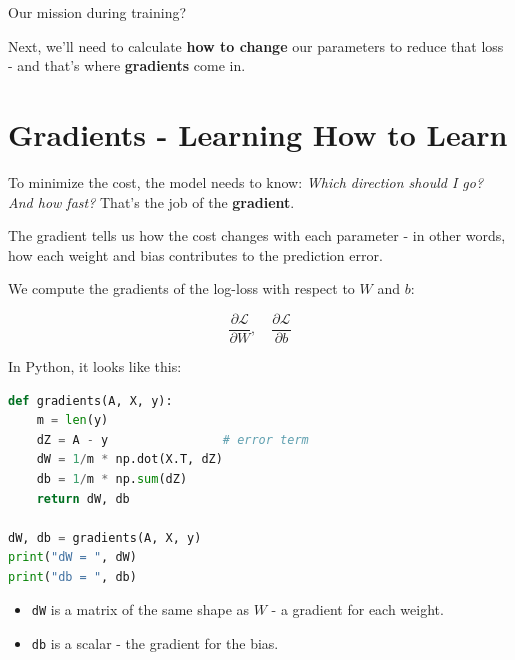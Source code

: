 \documentclass[11pt]{article}
\begin{document}
\vspace{0.5em}

\noindent Our mission during training?  
\begin{center}
\end{center}

Next, we'll need to calculate \textbf{how to change} our parameters to reduce that loss - and that's where \textbf{gradients} come in.

\section*{Gradients - Learning How to Learn}

\begin{tcolorbox}[colback=gray!5, colframe=black!50, title=Step 4: Which Way to Go?, fonttitle=\bfseries, arc=2mm]
To minimize the cost, the model needs to know: \textit{Which direction should I go? And how fast?}  
That's the job of the \textbf{gradient}.
\end{tcolorbox}

\vspace{1em}

The gradient tells us how the cost changes with each parameter -  
in other words, how each weight and bias contributes to the prediction error.

\vspace{0.5em}

We compute the gradients of the log-loss with respect to $W$ and $b$:

\[
\frac{\partial \mathcal{L}}{\partial W}, \quad \frac{\partial \mathcal{L}}{\partial b}
\]

\noindent In Python, it looks like this:

\begin{lstlisting}[language=Python]
def gradients(A, X, y):
    m = len(y)
    dZ = A - y                # error term
    dW = 1/m * np.dot(X.T, dZ)
    db = 1/m * np.sum(dZ)
    return dW, db

dW, db = gradients(A, X, y)
print("dW = ", dW)
print("db = ", db)
\end{lstlisting}

\vspace{0.5em}

\begin{itemize}
    \item \texttt{dW} is a matrix of the same shape as $W$ - a gradient for each weight.
    \item \texttt{db} is a scalar - the gradient for the bias.
\end{itemize}
\end{document}
